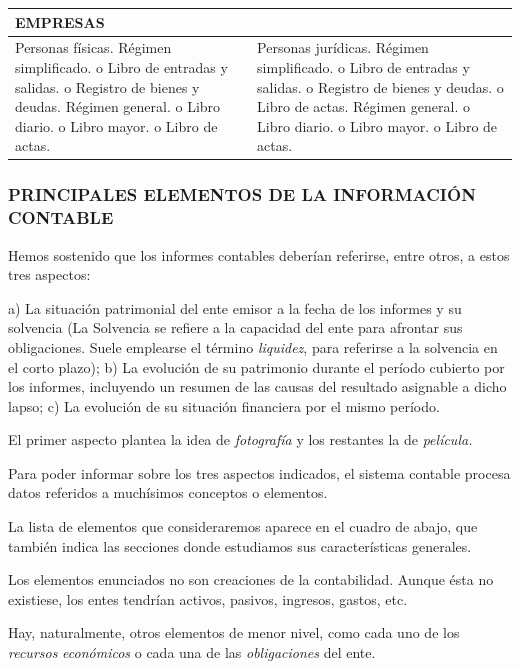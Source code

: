 \begin{center}
\small
\begin{tabular}{|p{}|p{}|}
\hline
\multicolumn{2}{|p{\dimexpr0.860\linewidth-2\tabcolsep\relax}|}{EMPRESAS} \\ \hline
Personas físicas. Régimen simplificado. o Libro de entradas y salidas. o Registro de bienes y deudas. Régimen general. o Libro diario. o Libro mayor. o Libro de actas. & Personas jurídicas. Régimen simplificado. o Libro de entradas y salidas. o Registro de bienes y deudas. o Libro de actas. Régimen general. o Libro diario. o Libro mayor. o Libro de actas. \\ \hline
\end{tabular}
\end{center}

\subsubsection*{PRINCIPALES ELEMENTOS DE LA INFORMACIÓN CONTABLE}
Hemos sostenido que los informes contables deberían referirse, entre otros, a estos tres aspectos:

a) La situación patrimonial del ente emisor a la fecha de los informes y su solvencia (La Solvencia se refiere a la capacidad del ente para afrontar sus obligaciones. Suele emplearse el término \textit{liquidez}, para referirse a la solvencia en el corto plazo); b) La evolución de su patrimonio durante el período cubierto por los informes, incluyendo un resumen de las causas del resultado asignable a dicho lapso; c) La evolución de su situación financiera por el mismo período.

El primer aspecto plantea la idea de \textit{fotografía }y los restantes la de \textit{película.}

Para poder informar sobre los tres aspectos indicados, el sistema contable procesa datos referidos a muchísimos conceptos o elementos.

La lista de elementos que consideraremos aparece en el cuadro de abajo, que también indica las secciones donde estudiamos sus características generales.

Los elementos enunciados no son creaciones de la contabilidad. Aunque ésta no existiese, los entes tendrían activos, pasivos, ingresos, gastos, etc.

Hay, naturalmente, otros elementos de menor nivel, como cada uno de los \textit{recursos} \textit{económicos }o cada una de las \textit{obligaciones }del ente.


